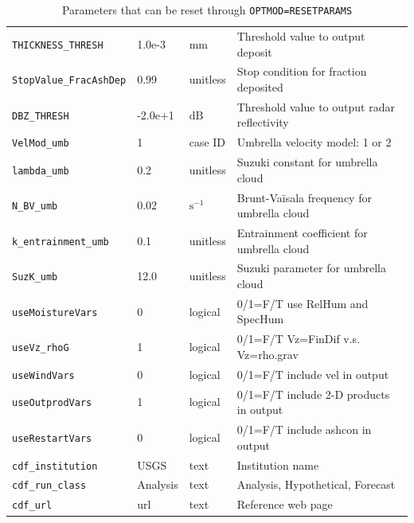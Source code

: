 \begin{table}[htbp]
\begin{center}
\begin{tabular}{| l | l | l | l |}
\texttt{THICKNESS\_THRESH} & 1.0e-3   & $\mathrm{mm}$      &  Threshold value to output deposit \\
\texttt{StopValue\_FracAshDep} & 0.99 & unitless           &  Stop condition for fraction deposited \\
\texttt{DBZ\_THRESH}       & -2.0e+1  & $\mathrm{dB}$      &  Threshold value to output radar reflectivity \\
\texttt{VelMod\_umb}       & 1        & case ID            &  Umbrella velocity model: 1 \cite{Costa2014} or 2 \cite{Webster2020} \\
\texttt{lambda\_umb}       & 0.2      & unitless           &  Suzuki constant for umbrella cloud \\
\texttt{N\_BV\_umb}        & 0.02     & $\mathrm{s^{-1}}$  &  Brunt-Va\"isala frequency for umbrella cloud \\
\texttt{k\_entrainment\_umb} & 0.1    & unitless           &  Entrainment coefficient for umbrella cloud \\
\texttt{SuzK\_umb}         & 12.0     & unitless           &  Suzuki parameter for umbrella cloud \\
\texttt{useMoistureVars}   & 0        & logical            &  0/1=F/T use RelHum and SpecHum \\
\texttt{useVz\_rhoG}       & 1        & logical            &  0/1=F/T Vz=FinDif v.s. Vz=rho.grav \\
\texttt{useWindVars}       & 0        & logical            &  0/1=F/T include vel in output \\
\texttt{useOutprodVars}    & 1        & logical            &  0/1=F/T include 2-D products in output \\
\texttt{useRestartVars}    & 0        & logical            &  0/1=F/T include ashcon in output \\
\texttt{cdf\_institution}  & USGS     & text               &  Institution name \\
\texttt{cdf\_run\_class}   & Analysis & text               &  Analysis, Hypothetical, Forecast \\
\texttt{cdf\_url}          & url      & text               &  Reference web page \\
\hline
\end{tabular}
\caption{\label{tab:ResetParam}Parameters that can be reset through \texttt{OPTMOD=RESETPARAMS}}
\end{center}
\end{table}
\normalsize

